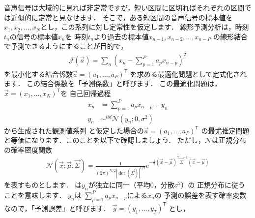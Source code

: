 音声信号は大域的に見れば非定常ですが，短い区間に区切ればそれぞれの区間では近似的に定常と見なせます．
そこで，ある短区間の音声信号の標本値を$x_1,x_2,\ldots,x_N$とし，この系列に対し定常性を仮定します．
線形予測分析は，時刻$t_n$の信号の標本値$x_n$を
時刻$t_n$より過去の標本値$x_{n-1},x_{n-2},\ldots,x_{n-P}$
の線形結合で予測できるようにすることが目的で，
\begin{align}
\mathcal{J}(\Vec{a}) =
\sum_n \left(
x_n - \sum_{p=1}^{P} a_p x_{n-p}
\right)^2
\label{eq:lp}
\end{align}
を最小化する結合係数$\Vec{a} = (a_1,\ldots,a_P)^{\mathsf T}$
を求める最適化問題として定式化されます．
この結合係数を「予測係数」と呼びます．
この最適化問題は，
$\Vec{x} =(x_1,\ldots,x_N)^{\mathsf T}$を
自己回帰過程
\begin{align}
x_n &= 
\sum_{p=1}^P a_p x_{n-p} + y_n
\label{eq:AR}\\
y_n  &\mathop{\sim}^{iid} \mathcal{N}(y_n;0,\sigma^2)~~
\label{eq:Gaussnoise}
\end{align}
から生成された観測値系列
と仮定した場合の$\Vec{a} = (a_1,\ldots,a_P)^{\mathsf T}$
の最尤推定問題
と等価になります\cite{Itakura1972}．このことを以下で確認しましょう．
ただし，$\mathcal{N}$は正規分布の確率密度関数
\begin{align}
\mathcal{N}(\Vec{x};\Vec{\mu},\Vec{\Sigma})= \frac{1}{(2\pi)^{N/2}|\det(\Vec{\Sigma})|^{1/2}}
e^{-\frac{1}{2}(\Vec{x}-\Vec{\mu})^{\mathsf T}\Vec{\Sigma}^{-1}(\Vec{x}-\Vec{\mu})}
\end{align}
を表すものとします．
は$y_n$が独立に同一（平均0，分散$\sigma^2$）の
正規分布に従うことを意味します．
$y_n$は
$\sum_{p=1}^P a_p x_{n-p}$による$x_n$の
予測の誤差を表す確率変数なので，「予測誤差」と呼びます．
$\Vec{y} = (y_1,\ldots,y_T)^{\mathsf T}$
とし，
